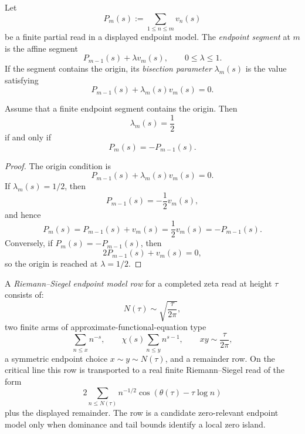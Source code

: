\begin{definition}
\label{def:unified-reality-finite-endpoint-segment-bisection-parameter}
Let
$$
P_m(s):=\sum_{1\le n\le m}v_n(s)
$$
be a finite partial read in a displayed endpoint model.  The
\emph{endpoint segment} at $m$ is the affine segment
$$
P_{m-1}(s)+\lambda v_m(s),
\qquad 0\le\lambda\le1.
$$
If the segment contains the origin, its \emph{bisection parameter}
$\lambda_m(s)$ is the value satisfying
$$
P_{m-1}(s)+\lambda_m(s)v_m(s)=0.
$$
\end{definition}

\begin{theorem}
\label{thm:unified-reality-endpoint-bisection-endpoint-symmetry}
Assume that a finite endpoint segment contains the origin.  Then
$$
\lambda_m(s)=\frac12
$$
if and only if
$$
P_m(s)=-P_{m-1}(s).
$$
\end{theorem}

\begin{proof}
The origin condition is
$$
P_{m-1}(s)+\lambda_m(s)v_m(s)=0.
$$
If $\lambda_m(s)=1/2$, then
$$
P_{m-1}(s)=-\frac12v_m(s),
$$
and hence
$$
P_m(s)=P_{m-1}(s)+v_m(s)=\frac12v_m(s)=-P_{m-1}(s).
$$
Conversely, if $P_m(s)=-P_{m-1}(s)$, then
$$
2P_{m-1}(s)+v_m(s)=0,
$$
so the origin is reached at $\lambda=1/2$.
\end{proof}

\begin{definition}
\label{def:unified-reality-riemann-siegel-endpoint-model-row}
A \emph{Riemann--Siegel endpoint model row} for a completed zeta read at
height $\tau$ consists of:
$$
N(\tau)\sim\sqrt{\frac{\tau}{2\pi}},
$$
two finite arms of approximate-functional-equation type
$$
\sum_{n\le x}n^{-s},
\qquad
\chi(s)\sum_{n\le y}n^{s-1},
\qquad
xy\sim\frac{\tau}{2\pi},
$$
a symmetric endpoint choice $x\sim y\sim N(\tau)$, and a remainder row.
On the critical line this row is transported to a real finite
Riemann--Siegel read of the form
$$
2\sum_{n\le N(\tau)}
n^{-1/2}\cos(\theta(\tau)-\tau\log n)
$$
plus the displayed remainder.  The row is a candidate zero-relevant
endpoint model only when dominance and tail bounds identify a local
zero island.
\end{definition}

